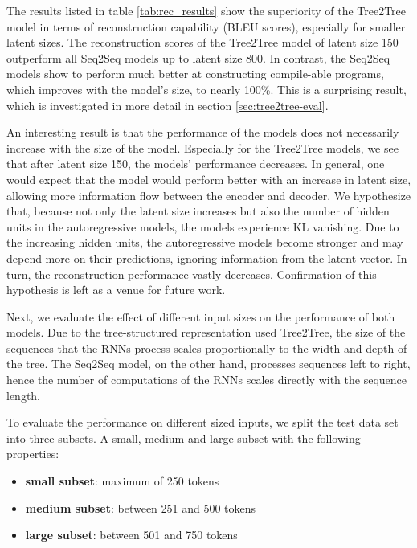 The results listed in table \ref{tab:rec_results} show the superiority of the Tree2Tree model in terms of reconstruction capability (BLEU scores), especially for smaller latent sizes. The reconstruction scores of the Tree2Tree model of latent size 150 outperform all Seq2Seq models up to latent size 800. In contrast, the Seq2Seq models show to perform much better at constructing compile-able programs, which improves with the model's size, to nearly 100\%. This is a surprising result, which is investigated in more detail in section \ref{sec:tree2tree-eval}.

 


An interesting result is that the performance of the models does not necessarily increase with the size of the model. Especially for the Tree2Tree models, we see that after latent size 150, the models' performance decreases. In general, one would expect that the model would perform better with an increase in latent size, allowing more information flow between the encoder and decoder. We hypothesize that, because not only the latent size increases but also the number of hidden units in the autoregressive models, the models experience KL vanishing. Due to the increasing hidden units, the autoregressive models become stronger and may depend more on their predictions, ignoring information from the latent vector. In turn, the reconstruction performance vastly decreases. Confirmation of this hypothesis is left as a venue for future work.



Next, we evaluate the effect of different input sizes on the performance of both models. Due to the tree-structured representation used Tree2Tree, the size of the sequences that the RNNs process scales proportionally to the width and depth of the tree. The Seq2Seq model, on the other hand, processes sequences left to right, hence the number of computations of the RNNs scales directly with the sequence length. 



To evaluate the performance on different sized inputs, we split the test data set into three subsets. A small, medium and large subset with the following properties:

\begin{itemize}
    \item \textbf{small subset}: maximum of 250 tokens
    \item \textbf{medium subset}: between 251 and 500 tokens
    \item \textbf{large subset}: between 501 and 750 tokens
\end{itemize}


